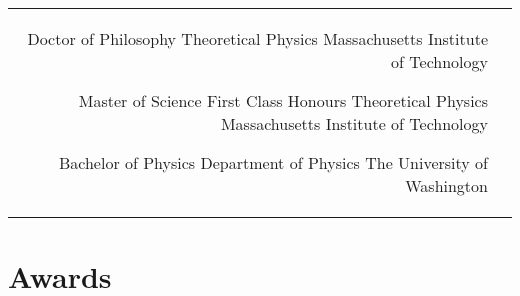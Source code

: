 \documentclass[10pt]{article} %
\begin{document}
\begin{paracol}{2}


\begin{supertabular}{rl} %

	
	{Doctor of Philosophy} %
	{} %
	{Theoretical Physics} %
	{Massachusetts Institute of Technology} %
	
	
	{Master of Science} %
	{First Class Honours} %
	{Theoretical Physics} %
	{Massachusetts Institute of Technology} %
	
	
	{Bachelor of Physics} %
	{} %
	{Department of Physics} %
	{The University of Washington} %
	

\end{supertabular}


\section{Awards}






\end{paracol}
\end{document}
